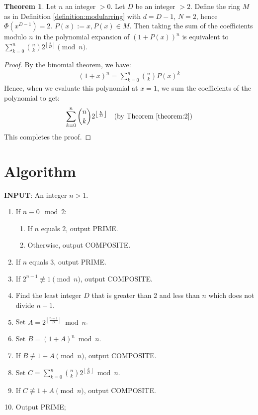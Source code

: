 \documentclass{article}
\theoremstyle{plain}
\theoremstyle{definition}
\newtheorem{theorem}{Theorem}
\begin{document}
\begin{theorem} \label{theorem:3}
Let $n$ an integer $>0$. Let $D$ be an integer $>2$. Define the ring $M$ as in Definition \ref{definition:modularring} with $d=D-1$, $N=2$, hence $\Phi(x^{D-1}) = 2$. $P(x) := x, P(x) \in M$. Then taking the sum of the coefficients modulo $n$ in the polynomial expansion of \( (1 + P(x))^n \) is equivalent to $\sum_{k=0}^{n} \binom{n}{k} 2^{\left\lfloor \frac{k}{D} \right\rfloor} \pmod{n}$.
\end{theorem}
\begin{proof}
By the binomial theorem, we have:
\begin{align}
    (1 + x)^n = \sum_{k=0}^{n} \binom{n}{k} P(x)^{k}
\end{align}
Hence, when we evaluate this polynomial at \( x = 1 \), we sum the coefficients of the polynomial to get:
\begin{align}
    \sum_{k=0}^{n} \binom{n}{k} 2^{\left\lfloor \frac{k}{D} \right\rfloor} \quad \text{(by Theorem \ref{theorem:2})}
\end{align}
This completes the proof.
\end{proof}

\section{Algorithm} \label{section:algorithm}
\textbf{INPUT}: An integer $n > 1$.
\begin{center}
    \begin{enumerate}
        \item If $n \equiv 0 \mod{2}$:
            \begin{enumerate}
                \item If $n$ equals $2$, output PRIME.
                \item Otherwise, output COMPOSITE.
            \end{enumerate}
        \item If $n$ equals $3$, output PRIME.
        \item If $2^{n-1} \not\equiv 1 \pmod{n}$, output COMPOSITE.
        \item Find the least integer $D$ that is greater than 2 and less than $n$ which does not divide $n-1$.
        \item Set $A = 2^{\left\lfloor \frac{n-1}{D} \right\rfloor} \bmod{n}$.
        \item Set $B = (1 + A)^n \bmod{n}$.
        \item If $B \not\equiv 1 + A \pmod{n}$, output COMPOSITE.
        \item Set $C = \sum_{k=0}^{n} \binom{n}{k} 2^{\left\lfloor \frac{k}{D} \right\rfloor} \bmod{n}$.
        \item If $C \not\equiv 1 + A \pmod{n}$, output COMPOSITE.
        \item Output PRIME;
    \end{enumerate}
\end{center}
\end{document}
